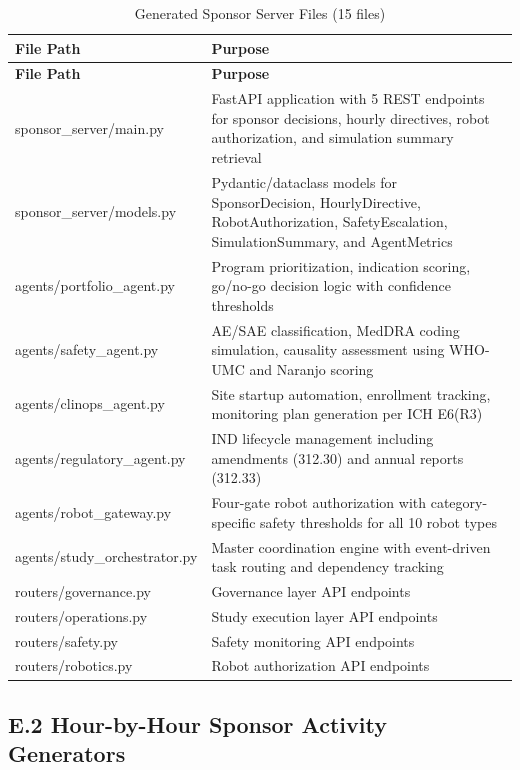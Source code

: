 \begin{longtable}{>{\raggedright\arraybackslash}p{4.5cm}
>{\raggedright\arraybackslash}p{7cm}}
\caption{Generated Sponsor Server Files (15 files)}
\label{tab:server-files} \\
\toprule
\textbf{File Path} & \textbf{Purpose} \\
\midrule
\endfirsthead
\toprule
\textbf{File Path} & \textbf{Purpose} \\
\midrule
\endhead
\bottomrule
\endlastfoot
sponsor\_server/main.py & FastAPI application with 5 REST endpoints for
sponsor decisions, hourly directives, robot authorization, and simulation
summary retrieval \\
sponsor\_server/models.py & Pydantic/dataclass models for SponsorDecision,
HourlyDirective, RobotAuthorization, SafetyEscalation, SimulationSummary,
and AgentMetrics \\
agents/portfolio\_agent.py & Program prioritization, indication scoring,
go/no-go decision logic with confidence thresholds \\
agents/safety\_agent.py & AE/SAE classification, MedDRA coding simulation,
causality assessment using WHO-UMC and Naranjo scoring \\
agents/clinops\_agent.py & Site startup automation, enrollment tracking,
monitoring plan generation per ICH E6(R3) \\
agents/regulatory\_agent.py & IND lifecycle management including
amendments (312.30) and annual reports (312.33) \\
agents/robot\_gateway.py & Four-gate robot authorization with
category-specific safety thresholds for all 10 robot types \\
agents/study\_orchestrator.py & Master coordination engine with
event-driven task routing and dependency tracking \\
routers/governance.py & Governance layer API endpoints \\
routers/operations.py & Study execution layer API endpoints \\
routers/safety.py & Safety monitoring API endpoints \\
routers/robotics.py & Robot authorization API endpoints \\
\end{longtable}

\subsection*{E.2 Hour-by-Hour Sponsor Activity Generators}

